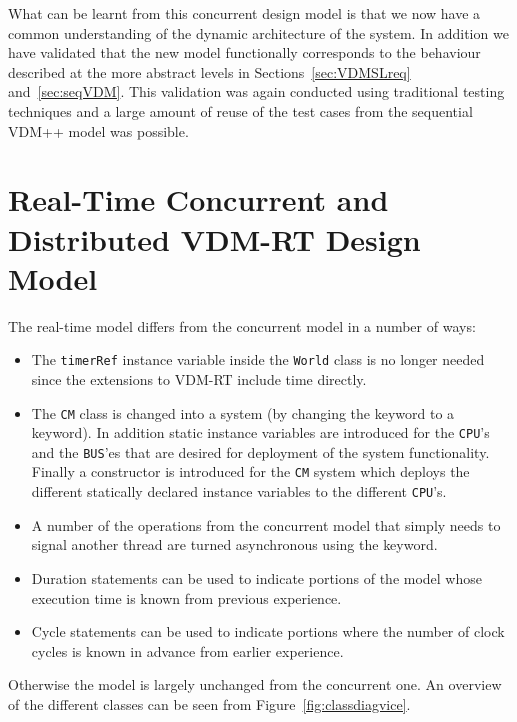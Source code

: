 \documentclass{overturerepchap}
\begin{document}
What can be learnt from this concurrent design model is
that we now have a common understanding of the dynamic architecture of
the system. In addition we have validated that the new model
functionally corresponds to the behaviour described at the more
abstract levels in Sections~\ref{sec:VDMSLreq}
and~\ref{sec:seqVDM}. This validation was again conducted using
traditional testing techniques and a large amount of reuse of the test
cases from the sequential VDM++ model was possible.

\section{Real-Time Concurrent and Distributed VDM-RT Design Model}\label{sec:realtime}

The real-time model differs from the concurrent model in a number of ways:

\begin{itemize}
\item The \texttt{timerRef} instance
  variable inside the \texttt{World} class is no longer needed since
  the extensions to VDM-RT include time directly.
\item The \texttt{CM} class is changed into a system (by changing the
{\bf{}} keyword to a {\bf{}} keyword). In addition
static instance variables are introduced for the \texttt{CPU}'s and the
\texttt{BUS}'es that are desired for deployment of the system functionality.
Finally a constructor is introduced for the \texttt{CM} system which deploys
the different statically declared instance variables to the different 
\texttt{CPU}'s.
\item A number of the operations from the concurrent model that simply
  needs to signal another thread are turned asynchronous using the
  {\bf{}} keyword.
\item Duration statements can be used to indicate portions of the model
whose execution time is known from previous experience.
\item Cycle statements can be used to indicate portions where the number 
of clock cycles is known in advance from earlier experience.
\end{itemize}

Otherwise the model is largely unchanged from the concurrent one. An
overview of the different classes can be seen from
Figure~\ref{fig:classdiagvice}.
\end{document}
